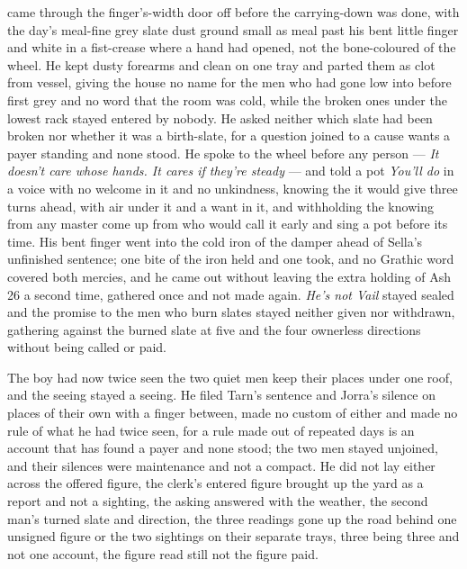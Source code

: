 came through the finger's-width door off  before the carrying-down was done, with the day's meal-fine grey slate dust ground small as meal past his bent little finger and white in a fist-crease where a hand had opened, not the bone-coloured  of the wheel. He kept dusty forearms and clean on one tray and parted them as clot from vessel, giving the house no name for the men who had gone low into  before first grey and no word that the room was cold, while the broken ones under the lowest rack stayed entered by nobody. He asked neither which slate had been broken nor whether it was a birth-slate, for a question joined to a cause wants a payer standing and none stood. He spoke to the wheel before any person --- \emph{It doesn't care whose hands. It cares if they're steady} --- and told a pot \emph{You'll do} in a voice with no welcome in it and no unkindness, knowing the  it would give three turns ahead, with air under it and a want in it, and withholding the knowing from any master come up from  who would call it early and sing a pot before its time. His bent finger went into the cold iron of the damper ahead of Sella's unfinished sentence; one bite of the iron held and one took, and no Grathic word covered both mercies, and he came out without leaving the extra holding of Ash 26 a second time, gathered once and not made again. \emph{He's not Vail} stayed sealed and the promise to the men who burn slates stayed neither given nor withdrawn, gathering against the burned slate at five and the four ownerless directions without being called or paid.

The boy had now twice seen the two quiet men keep their places under one roof, and the seeing stayed a seeing. He filed Tarn's sentence and Jorra's silence on places of their own with a finger between, made no custom of either and made no rule of what he had twice seen, for a rule made out of repeated days is an account that has found a payer and none stood; the two men stayed unjoined, and their silences were maintenance and not a compact. He did not lay either across the offered figure, the clerk's entered figure brought up the yard as a report and not a sighting, the asking answered with the weather, the second man's turned slate and direction, the three readings gone up the road behind one unsigned figure or the two sightings on their separate trays, three being three and not one account, the figure read still not the figure paid.

